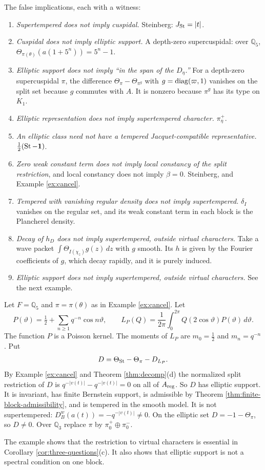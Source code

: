 The false implications, each with a witness:
\begin{enumerate}[leftmargin=*]
\item \emph{Supertempered does not imply cuspidal.} Steinberg: $J_{\operatorname{St}}=|t|$.
\item \emph{Cuspidal does not imply elliptic support.} A depth-zero supercuspidal: over $\mathbb Q_5$, $\Theta_{\pi(\theta)}(a(1+5^n))=5^n-1$.
\item \emph{Elliptic support does not imply ``in the span of the $D_\eta$.''} For a depth-zero supercuspidal $\pi$, the difference $\Theta_\pi-\Theta_{\pi^g}$ with $g=\operatorname{diag}(\varpi,1)$ vanishes on the split set because $g$ commutes with $A$. It is nonzero because $\pi^g$ has its type on $K_1$.
\item \emph{Elliptic representation does not imply supertempered character.} $\pi_\eta^+$.
\item \emph{An elliptic class need not have a tempered Jacquet-compatible representative.} $\tfrac12(\operatorname{St}-\mathbf 1)$.
\item \emph{Zero weak constant term does not imply local constancy of the split restriction}, and local constancy does not imply $\beta=0$. Steinberg, and Example \ref{ex:cancel}.
\item \emph{Tempered with vanishing regular density does not imply supertempered.} $\delta_I$ vanishes on the regular set, and its weak constant term in each block is the Plancherel density.
\item \emph{Decay of $h_D$ does not imply supertempered, outside virtual characters.} Take a wave packet $\int\Theta_{I(\chi_z)}g(z)\,dz$ with $g$ smooth. Its $h$ is given by the Fourier coefficients of $g$, which decay rapidly, and it is purely induced.
\item \emph{Elliptic support does not imply supertempered, outside virtual characters.} See the next example.
\end{enumerate}

\begin{example}\label{ex:poisson}Let $F=\mathbb Q_5$ and $\pi=\pi(\theta)$ as in Example \ref{ex:cancel}. Let\[P(\vartheta)=\tfrac12+\sum_{n\ge1}q^{-n}\cos n\vartheta,\qquad L_P(Q)=\frac1{2\pi}\int_0^{2\pi}Q(2\cos\vartheta)P(\vartheta)\,d\vartheta .\]The function $P$ is a Poisson kernel. The moments of $L_P$ are $m_0=\tfrac12$ and $m_n=q^{-n}$. Put
\[
D=\Theta_{\operatorname{St}}-\Theta_\pi-D_{L_P}.
\]
By Example \ref{ex:cancel} and Theorem \ref{thm:decomp}(d) the normalized split restriction of $D$ is $q^{-|v(t)|}-q^{-|v(t)|}=0$ on all of $A_{\rm reg}$. So $D$ has elliptic support. It is invariant, has finite Bernstein support, is admissible by Theorem \ref{thm:finite-block-admissibility}, and is tempered in the smooth model. It is not supertempered: $D^w_B(a(t))=-q^{-|v(t)|}\ne0$. On the elliptic set $D=-1-\Theta_\pi$, so $D\ne0$. Over $\mathbb Q_3$ replace $\pi$ by $\pi_0^+\oplus\pi_0^-$.
\end{example}
The example shows that the restriction to virtual characters is essential in Corollary \ref{cor:three-questions}(c). It also shows that elliptic support is not a spectral condition on one block.


